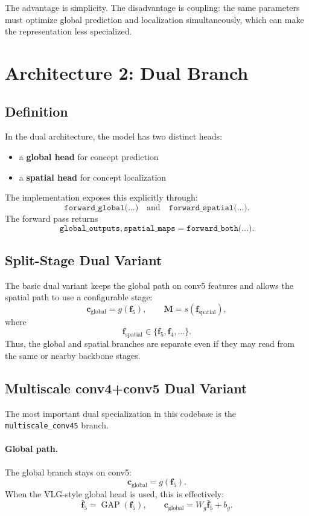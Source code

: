 \documentclass[11pt]{article}
\begin{document}
The advantage is simplicity. The disadvantage is coupling: the same parameters
must optimize global prediction and localization simultaneously, which can make
the representation less specialized.

\section{Architecture 2: Dual Branch}
\subsection{Definition}
In the dual architecture, the model has two distinct heads:
\begin{itemize}
    \item a \textbf{global head} for concept prediction
    \item a \textbf{spatial head} for concept localization
\end{itemize}

The implementation exposes this explicitly through:
\[
\texttt{forward\_global(...)} \quad \text{and} \quad \texttt{forward\_spatial(...)}.
\]
The forward pass returns
\[
\texttt{global\_outputs}, \texttt{spatial\_maps}
=
\texttt{forward\_both(...)}.
\]

\subsection{Split-Stage Dual Variant}
The basic dual variant keeps the global path on conv5 features and allows the
spatial path to use a configurable stage:
\[
\mathbf{c}_{\mathrm{global}} = g(\mathbf{f}_5),
\qquad
\mathbf{M} = s(\mathbf{f}_{\mathrm{spatial}}),
\]
where
\[
\mathbf{f}_{\mathrm{spatial}} \in \{\mathbf{f}_5, \mathbf{f}_4, \ldots\}.
\]
Thus, the global and spatial branches are separate even if they may read from
the same or nearby backbone stages.

\subsection{Multiscale conv4+conv5 Dual Variant}
The most important dual specialization in this codebase is the
\texttt{multiscale\_conv45} branch.

\paragraph{Global path.}
The global branch stays on conv5:
\[
\mathbf{c}_{\mathrm{global}} = g(\mathbf{f}_5).
\]
When the VLG-style global head is used, this is effectively:
\[
\bar{\mathbf{f}}_5 = \operatorname{GAP}(\mathbf{f}_5),
\qquad
\mathbf{c}_{\mathrm{global}} = W_g \bar{\mathbf{f}}_5 + b_g.
\]
\end{document}
